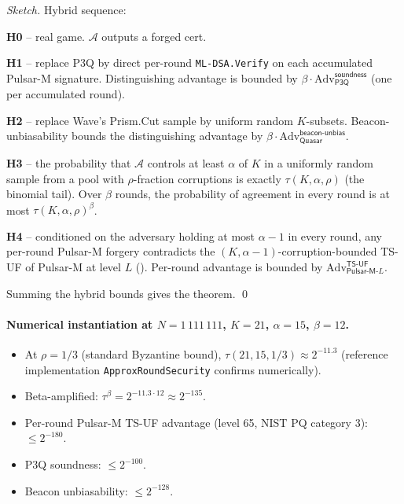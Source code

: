 \begin{proof}[Sketch]
Hybrid sequence:

\textbf{H0} -- real game. $\mathcal{A}$ outputs a forged cert.

\textbf{H1} -- replace P3Q by direct per-round
\texttt{ML-DSA.Verify} on each accumulated Pulsar-M signature.
Distinguishing advantage is bounded by
$\beta \cdot \mathrm{Adv}^{\mathsf{soundness}}_{\mathsf{P3Q}}$ (one
per accumulated round).

\textbf{H2} -- replace Wave's Prism.Cut sample by uniform random
$K$-subsets. Beacon-unbiasability bounds the distinguishing advantage
by $\beta \cdot \mathrm{Adv}^{\mathsf{beacon\text{-}unbias}}_{\mathsf{Quasar}}$.

\textbf{H3} -- the probability that $\mathcal{A}$ controls at least
$\alpha$ of $K$ in a uniformly random sample from a pool with
$\rho$-fraction corruptions is exactly $\tau(K, \alpha, \rho)$ (the
binomial tail). Over $\beta$ rounds, the probability of agreement
in every round is at most $\tau(K, \alpha, \rho)^\beta$.

\textbf{H4} -- conditioned on the adversary holding at most
$\alpha - 1$ in every round, any per-round Pulsar-M forgery
contradicts the $(K, \alpha-1)$-corruption-bounded TS-UF of
Pulsar-M at level $L$ (). Per-round
advantage is bounded by
$\mathrm{Adv}^{\mathsf{TS\text{-}UF}}_{\mathsf{Pulsar\text{-}M}\text{-}L}$.

Summing the hybrid bounds gives the theorem. \qed
\end{proof}

\paragraph{Numerical instantiation at $N = 1\,111\,111$, $K = 21$,
$\alpha = 15$, $\beta = 12$.}

\begin{itemize}[leftmargin=*, itemsep=0pt]
\item At $\rho = 1/3$ (standard Byzantine bound),
$\tau(21, 15, 1/3) \approx 2^{-11.3}$ (reference implementation
\texttt{ApproxRoundSecurity} confirms numerically).
\item Beta-amplified: $\tau^{\beta} = 2^{-11.3 \cdot 12} \approx 2^{-135}$.
\item Per-round Pulsar-M TS-UF advantage (level 65, NIST PQ
category 3): $\le 2^{-180}$.
\item P3Q soundness: $\le 2^{-100}$.
\item Beacon unbiasability: $\le 2^{-128}$.
\end{itemize}

